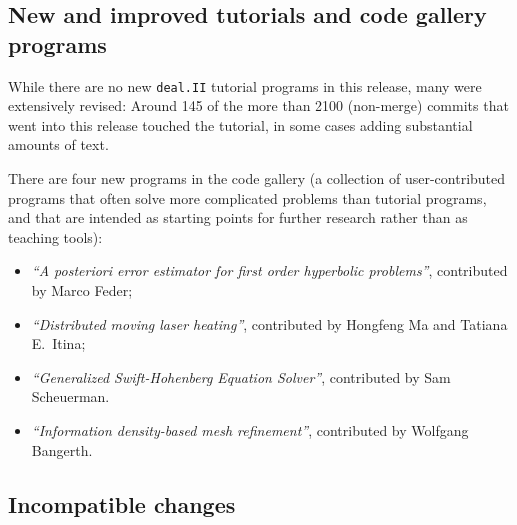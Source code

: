 \documentclass{ansarticle-preprint}
\newcommand{\specialword}[1]{\texttt{#1}}
\newcommand{\dealii}{{\specialword{deal.II}}\xspace}
\begin{document}


\subsection{New and improved tutorials and code gallery programs}
\label{subsec:steps}

While there are no new \dealii tutorial programs in this release, many
were extensively revised: Around 145 of the more than 2100 (non-merge)
commits that went into this release touched the tutorial, in some
cases adding substantial amounts of text.


There are four new programs in the code gallery (a collection of
user-contributed programs that often solve more complicated problems
than tutorial programs, and that are intended as starting points for further
research rather than as teaching tools):
\begin{itemize}
  \item \textit{``A posteriori error estimator for first order hyperbolic problems''},
  contributed by Marco Feder;
  \item \textit{``Distributed moving laser heating''}, contributed by
  Hongfeng Ma and Tatiana E.~Itina;
  \item \textit{``Generalized Swift-Hohenberg Equation Solver''}, contributed by
    Sam Scheuerman.
  \item \textit{``Information density-based mesh refinement''},
    contributed by Wolfgang Bangerth.
\end{itemize}


\subsection{Incompatible changes}\label{subsec:deprecated}
\end{document}
